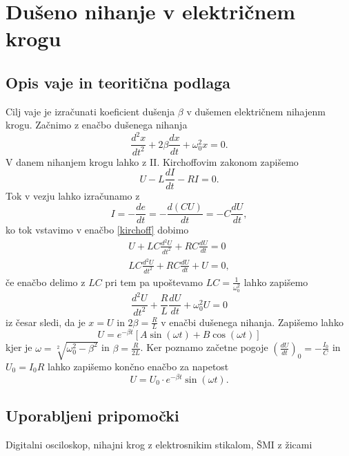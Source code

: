\documentclass[12pt]{article}
\begin{document}
\section{Dušeno nihanje v električnem krogu}
	\subsection*{Opis vaje in teoritična podlaga}
	Cilj vaje je izračunati koeficient dušenja $\beta$ v dušemen električnem nihajenm krogu.
	Začnimo z enačbo dušenega nihanja \cite{nihanje}
	\begin{equation}
		\frac{d^2 x}{dt^2} + 2\beta\frac{dx}{dt} + \omega_0^2 x =0 .
	\end{equation}
	V danem nihanjem krogu lahko z II. Kirchoffovim zakonom zapišemo
	\begin{equation}
		U - L\frac{dI}{dt} - RI = 0.
		\label{kirchoff}
	\end{equation}
	Tok v vezju lahko izračunamo z 
	\begin{equation}
		I = -\frac{de}{dt} = -\frac{d(CU)}{dt} = -C \frac{dU}{dt},
	\end{equation} ko tok vstavimo v enačbo \ref{kirchoff} dobimo
	\begin{equation}
		\begin{split}
			U + LC \frac{d^2U}{dt^2} + RC \frac{dU}{dt} = 0 \\
			LC \frac{d^2U}{dt^2} + RC \frac{dU}{dt} + U = 0,
		\end{split}
	\end{equation} če enačbo delimo z $LC$ pri tem pa upoštevamo $LC = \frac{1}{\omega_0^2}$ 
	lahko zapišemo
	\begin{equation}
		\frac{d^2U}{dt^2} + \frac{R}{L} \frac{dU}{dt} + \omega_0^2U = 0
	\end{equation} iz česar sledi, da je $x = U$ in $2\beta = \frac{R}{L}$ v enačbi dušenega
	nihanja. 
	Zapišemo lahko \cite{vaje}
	\begin{equation}
		U = e^{-\beta t}[A \sin(\omega t) + B \cos(\omega t)]
	\end{equation} kjer je $\omega = \sqrt[2]{\omega_0^2  - \beta^2}$ in $\beta = \frac{R}{2L}$.
	Ker poznamo začetne pogoje $(\frac{dU}{dt})_0 = - \frac{I_0}{C}$ in $U_0 = I_0 R$ lahko
	zapišemo končno enačbo za napetost
	\begin{equation}
		U = U_0 \cdot e^{-\beta t} \sin(\omega t).
	\end{equation}
	\subsection*{Uporabljeni pripomočki}
	Digitalni osciloskop, nihajni krog z elektrosnikim stikalom, ŠMI z žicami
\end{document}
